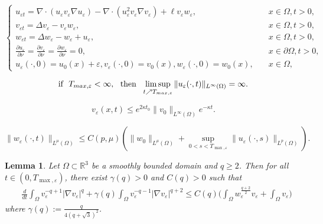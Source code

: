 \documentclass[10pt,a4paper]{amsart}
\newtheorem{lemma}{Lemma}
\begin{document}
\begin{equation}\label{2.5}
    \left\{\begin{array}{ll}
         u_{\varepsilon t}=\nabla\cdot(u_\varepsilon v_\varepsilon \nabla u_\varepsilon )-\nabla\cdot(u_\varepsilon ^2v_\varepsilon \nabla v_\varepsilon )+\ell v_\varepsilon w_\varepsilon ,& \quad x\in\Omega, t>0,\\
		v_{\varepsilon t}=\Delta v_\varepsilon -v_\varepsilon w_\varepsilon ,&\quad x\in\Omega, t>0,\\
		w_{\varepsilon t}=\Delta w_\varepsilon -w_\varepsilon +u_\varepsilon ,&\quad x\in\Omega, t>0,\\
	\frac{\partial u_\varepsilon}{\partial\nu}=\frac{\partial v_\varepsilon}{\partial\nu}=\frac{\partial w_\varepsilon}{\partial\nu}=0,
&\quad x\in\partial\Omega, t>0,\\
		u_\varepsilon (\cdot,0)=u_{0}(x)+\varepsilon ,v_\varepsilon (\cdot,0)=v_{0}(x),w_\varepsilon (\cdot,0)=w_{0}(x),&\quad x\in\Omega,
    \end{array}
    \right.
\end{equation}

  \begin{equation} \label{2.6}
   \hbox{if}~~  T_{max,\varepsilon}<\infty, ~~ \mbox{then}~~
   \limsup_{t\nearrow T_{max,\varepsilon}}\|u_\varepsilon(\cdot , t)\|_{L^{\infty}(\Omega)}=\infty.
\end{equation}

\begin{equation}\label{2.12}
v_\varepsilon(x,t)\leq e^{2\kappa t_0}\|v_0\|_{L^{\infty}(\Omega)}e^{-\kappa t}.
\end{equation}

\begin{equation}\label{2.14}
    \|w_\varepsilon(\cdot,t)\|_{L^{\mu}(\Omega)}\leq C(p,\mu)(\|w_{0}\|_{L^{\mu}(\Omega)}+\sup\limits_{0<s<T_{\max,\varepsilon}}\|u_\varepsilon(\cdot,s)\|_{L^p(\Omega)}).
\end{equation}

\begin{lemma}\label{lemma2.7}
    Let $\Omega\subset\mathbb{R}^3$ be a smoothly bounded domain and $q\geq2$. Then for all $t\in(0,T_{\max,\varepsilon})$, there exist $\gamma(q)>0$ and $C(q)>0$ such that
    \begin{equation}\label{2.15}
    \begin{split}
        &\frac{d}{dt}\int_{\Omega}v_\varepsilon^{-q+1}|\nabla v_\varepsilon|^q+\gamma(q)\int_{\Omega}v_\varepsilon^{-q-1}|\nabla v_\varepsilon|^{q+2}\leq  C(q)\bigg(\int_{\Omega}w_\varepsilon^{\frac{q+2}{2}}v_\varepsilon+\int_\Omega v_\varepsilon\bigg)
    \end{split}
    \end{equation}
    where $\gamma(q):=\frac{q}{4(q+\sqrt{3})^2}$.
\end{lemma}
\end{document}

